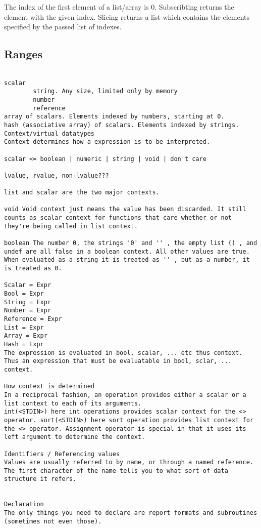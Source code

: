 \documentclass{article}
\begin{document}
\begin{description}
{The index of the first element of a list/array is 0. Subscribting
returns the element with the given index. Slicing returns a list which
contains the elements specified by the passed list of indexes.

\subsection{Ranges}


\begin{verbatim}

scalar
		string. Any size, limited only by memory
		number
		reference
array of scalars. Elements indexed by numbers, starting at 0.
hash (associative array) of scalars. Elements indexed by strings.
Context/virtual datatypes
Context determines how a expression is to be interpreted.

scalar <= boolean | numeric | string | void | don't care

lvalue, rvalue, non-lvalue???

list and scalar are the two major contexts.

void Void context just means the value has been discarded. It still counts as scalar context for functions that care whether or not they're being called in list context.

boolean The number 0, the strings '0' and '' , the empty list () , and undef are all false in a boolean context. All other values are true. When evaluated as a string it is treated as '' , but as a number, it is treated as 0.

Scalar = Expr
Bool = Expr
String = Expr
Number = Expr
Reference = Expr
List = Expr
Array = Expr
Hash = Expr
The expression is evaluated in bool, scalar, ... etc thus context. Thus an expression that must be evaluatable in bool, sclar, ... context.

How context is determined
In a reciprocal fashion, an operation provides either a scalar or a list context to each of its arguments.
int(<STDIN>) here int operations provides scalar context for the <> operator. sort(<STDIN>) here sort operation provides list context for the <> operator. Assignment operator is special in that it uses its left argument to determine the context.

Identifiers / Referencing values
Values are usually referred to by name, or through a named reference. The first character of the name tells you to what sort of data structure it refers. 


Declaration
The only things you need to declare are report formats and subroutines (sometimes not even those).


\end{verbatim}}
\end{description}
\end{document}
